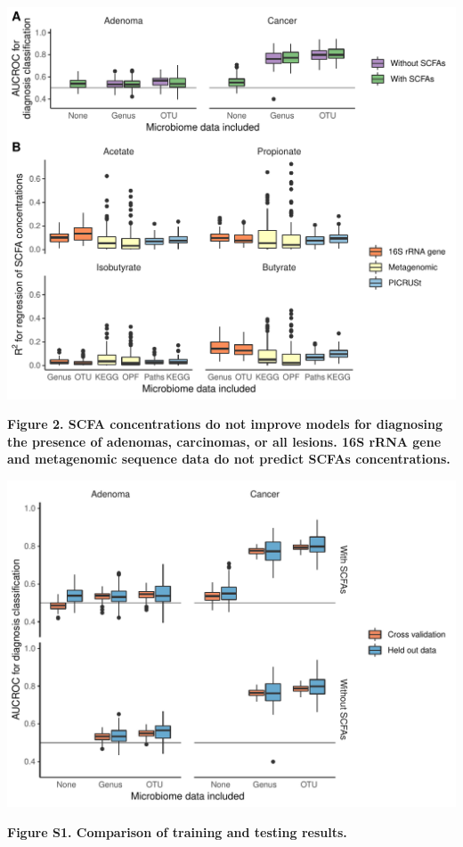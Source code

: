 \documentclass[11pt,]{article}
\begin{document}
\includegraphics{../results/figures/scfa_modelling.pdf}

\textbf{Figure 2. SCFA concentrations do not improve models for
diagnosing the presence of adenomas, carcinomas, or all lesions. 16S
rRNA gene and metagenomic sequence data do not predict SCFAs
concentrations.}

\newpage

\includegraphics{../results/figures/classification_testing.pdf}

\textbf{Figure S1. Comparison of training and testing results.}

\newpage
\end{document}
